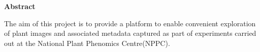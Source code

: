 \thispagestyle{empty}

\begin{center}
    {\LARGE\bf Abstract}
\end{center}

The aim of this project is to provide a platform to enable convenient exploration of plant images and associated metadata captured as part of experiments carried out at the National Plant Phenomics Centre(NPPC). 
